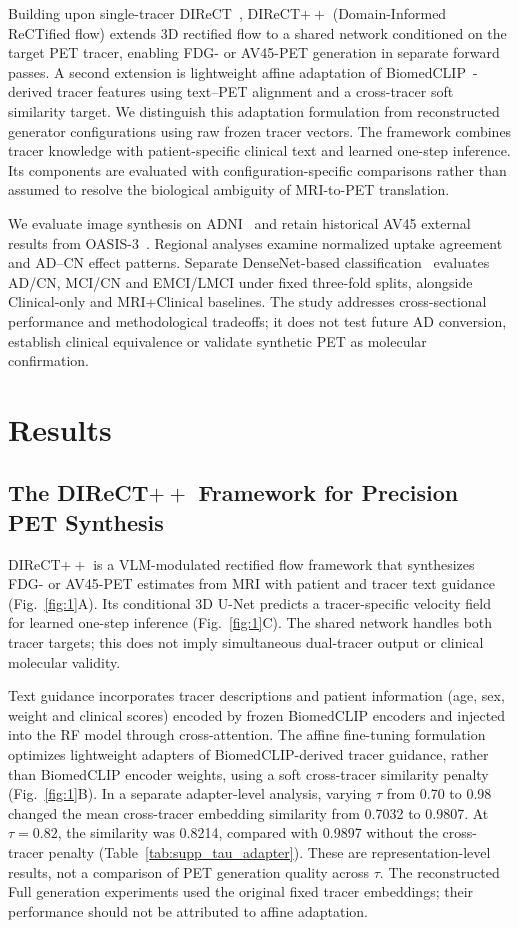 \documentclass{article}
\begin{document}
Building upon single-tracer DIReCT~\cite{liu2025direct}, DIReCT$++$ (Domain-Informed ReCTified flow) extends 3D rectified flow to a shared network conditioned on the target PET tracer, enabling FDG- or AV45-PET generation in separate forward passes. A second extension is lightweight affine adaptation of BiomedCLIP~\cite{zhang2025multimodal}-derived tracer features using text--PET alignment and a cross-tracer soft similarity target. We distinguish this adaptation formulation from reconstructed generator configurations using raw frozen tracer vectors. The framework combines tracer knowledge with patient-specific clinical text and learned one-step inference. Its components are evaluated with configuration-specific comparisons rather than assumed to resolve the biological ambiguity of MRI-to-PET translation.

We evaluate image synthesis on ADNI~\cite{weiner2010alzheimer} and retain historical AV45 external results from OASIS-3~\cite{lamontagne2019oasis}. Regional analyses examine normalized uptake agreement and AD--CN effect patterns. Separate DenseNet-based classification~\cite{huang2017densely} evaluates AD/CN, MCI/CN and EMCI/LMCI under fixed three-fold splits, alongside Clinical-only and MRI+Clinical baselines. The study addresses cross-sectional performance and methodological tradeoffs; it does not test future AD conversion, establish clinical equivalence or validate synthetic PET as molecular confirmation.


\section{Results}
\subsection{The \texorpdfstring{DIReCT$++$}{DIReCT++} Framework for Precision PET Synthesis}
DIReCT$++$ is a VLM-modulated rectified flow framework that synthesizes FDG- or AV45-PET estimates from MRI with patient and tracer text guidance (Fig.~\ref{fig:1}A). Its conditional 3D U-Net predicts a tracer-specific velocity field for learned one-step inference (Fig.~\ref{fig:1}C). The shared network handles both tracer targets; this does not imply simultaneous dual-tracer output or clinical molecular validity.

Text guidance incorporates tracer descriptions and patient information (age, sex, weight and clinical scores) encoded by frozen BiomedCLIP encoders and injected into the RF model through cross-attention. The affine fine-tuning formulation optimizes lightweight adapters of BiomedCLIP-derived tracer guidance, rather than BiomedCLIP encoder weights, using a soft cross-tracer similarity penalty (Fig.~\ref{fig:1}B). In a separate adapter-level analysis, varying $\tau$ from 0.70 to 0.98 changed the mean cross-tracer embedding similarity from 0.7032 to 0.9807. At $\tau=0.82$, the similarity was 0.8214, compared with 0.9897 without the cross-tracer penalty (Table~\ref{tab:supp_tau_adapter}). These are representation-level results, not a comparison of PET generation quality across $\tau$. The reconstructed Full generation experiments used the original fixed tracer embeddings; their performance should not be attributed to affine adaptation.
\end{document}
